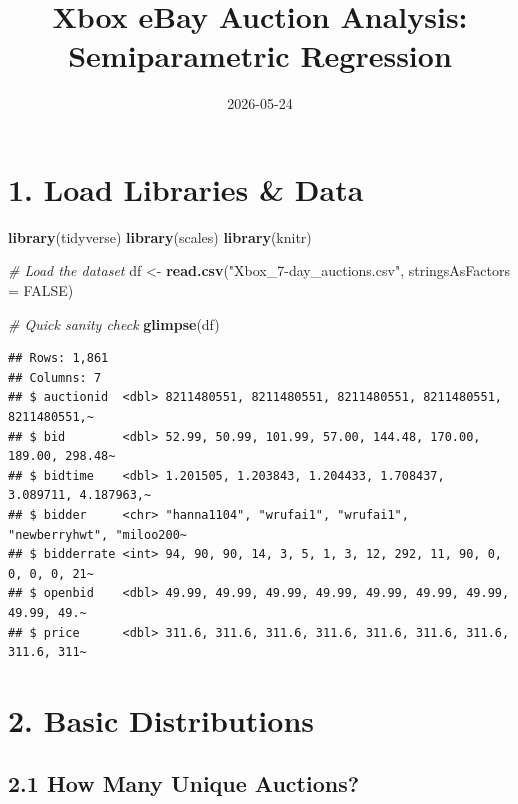 \documentclass[
]{article}
\title{Xbox eBay Auction Analysis: Semiparametric Regression}
\author{}
\date{\vspace{-2.5em}2026-05-24}
\newenvironment{Shaded}{\begin{snugshade}}{\end{snugshade}}
\newcommand{\AttributeTok}[1]{\textcolor[rgb]{0.13,0.29,0.53}{#1}}
\newcommand{\CommentTok}[1]{\textcolor[rgb]{0.56,0.35,0.01}{\textit{#1}}}
\newcommand{\ConstantTok}[1]{\textcolor[rgb]{0.56,0.35,0.01}{#1}}
\newcommand{\FunctionTok}[1]{\textcolor[rgb]{0.13,0.29,0.53}{\textbf{#1}}}
\newcommand{\NormalTok}[1]{#1}
\newcommand{\OtherTok}[1]{\textcolor[rgb]{0.56,0.35,0.01}{#1}}
\newcommand{\SpecialCharTok}[1]{\textcolor[rgb]{0.81,0.36,0.00}{\textbf{#1}}}
\newcommand{\StringTok}[1]{\textcolor[rgb]{0.31,0.60,0.02}{#1}}
\begin{document}
\maketitle

\section{1. Load Libraries \& Data}\label{load-libraries-data}

\begin{Shaded}
\begin{Highlighting}[]
\FunctionTok{library}\NormalTok{(tidyverse)}
\FunctionTok{library}\NormalTok{(scales)}
\FunctionTok{library}\NormalTok{(knitr)}

\CommentTok{\# Load the dataset}
\NormalTok{df }\OtherTok{\textless{}{-}} \FunctionTok{read.csv}\NormalTok{(}\StringTok{"Xbox\_7{-}day\_auctions.csv"}\NormalTok{, }\AttributeTok{stringsAsFactors =} \ConstantTok{FALSE}\NormalTok{)}

\CommentTok{\# Quick sanity check}
\FunctionTok{glimpse}\NormalTok{(df)}
\end{Highlighting}
\end{Shaded}

\begin{verbatim}
## Rows: 1,861
## Columns: 7
## $ auctionid  <dbl> 8211480551, 8211480551, 8211480551, 8211480551, 8211480551,~
## $ bid        <dbl> 52.99, 50.99, 101.99, 57.00, 144.48, 170.00, 189.00, 298.48~
## $ bidtime    <dbl> 1.201505, 1.203843, 1.204433, 1.708437, 3.089711, 4.187963,~
## $ bidder     <chr> "hanna1104", "wrufai1", "wrufai1", "newberryhwt", "miloo200~
## $ bidderrate <int> 94, 90, 90, 14, 3, 5, 1, 3, 12, 292, 11, 90, 0, 0, 0, 0, 21~
## $ openbid    <dbl> 49.99, 49.99, 49.99, 49.99, 49.99, 49.99, 49.99, 49.99, 49.~
## $ price      <dbl> 311.6, 311.6, 311.6, 311.6, 311.6, 311.6, 311.6, 311.6, 311~
\end{verbatim}

\section{2. Basic Distributions}\label{basic-distributions}

\subsection{2.1 How Many Unique
Auctions?}\label{how-many-unique-auctions}

\begin{Shaded}
\end{Shaded}
\end{document}

